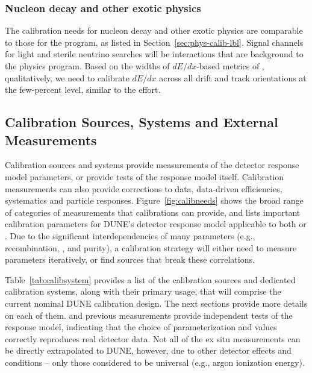\subsubsection{Nucleon decay and other exotic physics}
The calibration needs for nucleon decay and other exotic physics are comparable to those for the  program, as listed in Section~\ref{sec:phys-calib-lbl}. Signal channels for light  and sterile neutrino searches will be  interactions that are background to the  physics program. 
Based on the widths of $dE/dx$-based metrics of , qualitatively, we need to calibrate $dE/dx$ across all drift and track orientations at the few-percent level, similar to the  effort.





\subsection{Calibration Sources, Systems and External Measurements}
\label{sec:phys-calib-sources}
Calibration sources and systems provide measurements of the detector response model parameters, or provide tests of the response model itself. Calibration measurements can also provide corrections to data, data-driven efficiencies, systematics and particle responses. 
Figure~\ref{fig:calibneeds} shows the broad range of categories of measurements that calibrations can provide, and lists 
important calibration parameters for DUNE's detector response model applicable to both  or . Due to the significant interdependencies of many parameters (e.g., recombination, \efield, and \lar purity), a calibration strategy will either need to  measure parameters iteratively, or find sources that break these correlations.

Table~\ref{tab:calibsystem} provides a list of the calibration sources and dedicated calibration systems, along with their primary usage, that will comprise the current
nominal DUNE  calibration design. 
The next sections provide more details on each of them.  and previous measurements provide independent tests of the response model, indicating that the choice of parameterization and values correctly reproduces real detector data. 
Not all of the ex situ measurements can be directly extrapolated to DUNE, however, due to other detector effects and conditions -- only those considered to be universal (e.g., argon ionization energy). 

